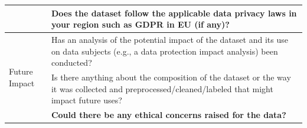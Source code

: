 \documentclass[journal]{IEEEtran}
\begin{document}
\begin{table}[]
\begin{tabular}{|p{}|p{}|}
 & \textbf{Does the dataset follow the applicable data privacy laws in your region such as GDPR in EU (if any)?}  \\ \hline
\multirow{3}{*}{Future Impact}  & Has an analysis of the potential impact of the dataset and its use on data subjects (e.g., a data protection impact analysis) been conducted?                                                                                                                                                                                                                            \\
                                & Is there anything about the composition of the dataset or the way it was collected and preprocessed/cleaned/labeled that might impact future uses?                                                                                                                                                                                                                       \\
                                & \textbf{Could there be any ethical concerns raised for the data?}                                                                                                                                                                                                                                                                                                        \\ \hline
\end{tabular}
\end{table}


\end{document}
